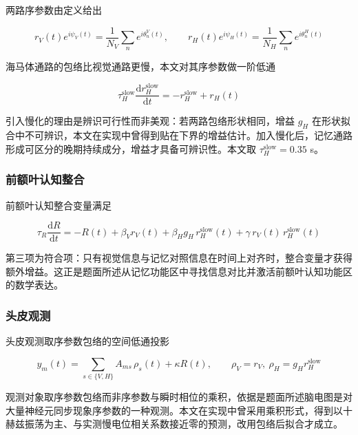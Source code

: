 \documentclass[bwprint]{gmcmthesis}
\begin{document}
两路序参数由定义给出

\begin{equation}
r_{V}(t)e^{i\psi_V(t)} = \frac{1}{N_V}\sum_{n}e^{i\theta_n^{V}(t)},\qquad r_{H}(t)e^{i\psi_H(t)} = \frac{1}{N_H}\sum_{n}e^{i\theta_n^{H}(t)}
\end{equation}

海马体通路的包络比视觉通路更慢，本文对其序参数做一阶低通

\begin{equation}
\tau_H^{\mathrm{slow}}\frac{\mathrm{d}r_H^{\mathrm{slow}}}{\mathrm{d}t} = -r_H^{\mathrm{slow}} + r_H(t)
\end{equation}

引入慢化的理由是辨识可行性而非美观：若两路包络形状相同，增益 $g_H$ 在形状拟合中不可辨识，本文在实现中曾得到贴在下界的增益估计。加入慢化后，记忆通路形成可区分的晚期持续成分，增益才具备可辨识性。本文取 $\tau_H^{\mathrm{slow}} = 0.35$ s。

\subsubsection{前额叶认知整合}

前额叶认知整合变量满足

\begin{equation}
\tau_R\frac{\mathrm{d}R}{\mathrm{d}t} = -R(t) + \beta_V r_V(t) + \beta_H g_H\, r_H^{\mathrm{slow}}(t) + \gamma\, r_V(t)\,r_H^{\mathrm{slow}}(t)
\end{equation}

第三项为符合项：只有视觉信息与记忆对照信息在时间上对齐时，整合变量才获得额外增益。这正是题面所述从记忆功能区中寻找信息对比并激活前额叶认知功能区的数学表达。

\subsubsection{头皮观测}

头皮观测取序参数包络的空间低通投影

\begin{equation}
y_m(t) = \sum_{s \in \{V,H\}} A_{ms}\,\rho_s(t) + \kappa R(t),\qquad \rho_V = r_V,\ \rho_H = g_H r_H^{\mathrm{slow}}
\end{equation}

观测对象取序参数包络而非序参数与瞬时相位的乘积，依据是题面所述脑电图是对大量神经元同步现象序参数的一种观测。本文在实现中曾采用乘积形式，得到以十赫兹振荡为主、与实测慢电位相关系数接近零的预测，改用包络后拟合才成立。
\end{document}
